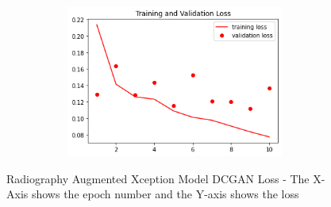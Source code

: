  \begin{figure}[H]
    \centering
    \includegraphics[width=1\textwidth,height=5cm,keepaspectratio]{Images/RadiographyCNNXceptionTrainAndValLossAugmentedDCGAN.png}\\
    \caption{Radiography Augmented Xception Model DCGAN Loss - The X-Axis shows the epoch number and the Y-axis shows the loss}
    \label{fig:Radiography Augmented Xception Model DCGAN Loss}
\end{figure}
